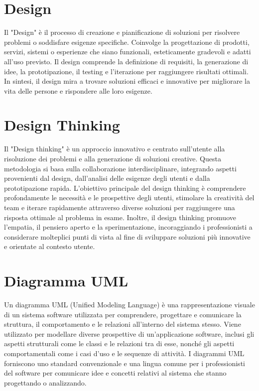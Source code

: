 \documentclass{article}
\begin{document}
\section{Design}
Il "Design" è il processo di creazione e pianificazione di soluzioni per risolvere problemi o soddisfare esigenze specifiche. Coinvolge la progettazione di prodotti, servizi, sistemi o esperienze che siano funzionali, esteticamente gradevoli e adatti all'uso previsto. Il design comprende la definizione di requisiti, la generazione di idee, la prototipazione, il testing e l'iterazione per raggiungere risultati ottimali. In sintesi, il design mira a trovare soluzioni efficaci e innovative per migliorare la vita delle persone e rispondere alle loro esigenze.

\section{Design Thinking}
Il "Design thinking" è un approccio innovativo e centrato sull'utente alla risoluzione dei problemi e alla generazione di soluzioni creative. Questa metodologia si basa sulla collaborazione interdisciplinare, integrando aspetti provenienti dal design, dall'analisi delle esigenze degli utenti e dalla prototipazione rapida. L'obiettivo principale del design thinking è comprendere profondamente le necessità e le prospettive degli utenti, stimolare la creatività del team e iterare rapidamente attraverso diverse soluzioni per raggiungere una risposta ottimale al problema in esame. Inoltre, il design thinking promuove l'empatia, il pensiero aperto e la sperimentazione, incoraggiando i professionisti a considerare molteplici punti di vista al fine di sviluppare soluzioni più innovative e orientate al contesto utente.

\section{Diagramma UML}
Un diagramma UML (Unified Modeling Language) è una rappresentazione visuale di un sistema software utilizzata per comprendere, progettare e comunicare la struttura, il comportamento e le relazioni all'interno del sistema stesso. Viene utilizzato per modellare diverse prospettive di un'applicazione software, inclusi gli aspetti strutturali come le classi e le relazioni tra di esse, nonché gli aspetti comportamentali come i casi d'uso e le sequenze di attività. I diagrammi UML forniscono uno standard convenzionale e una lingua comune per i professionisti del software per comunicare idee e concetti relativi al sistema che stanno progettando o analizzando.
\end{document}
